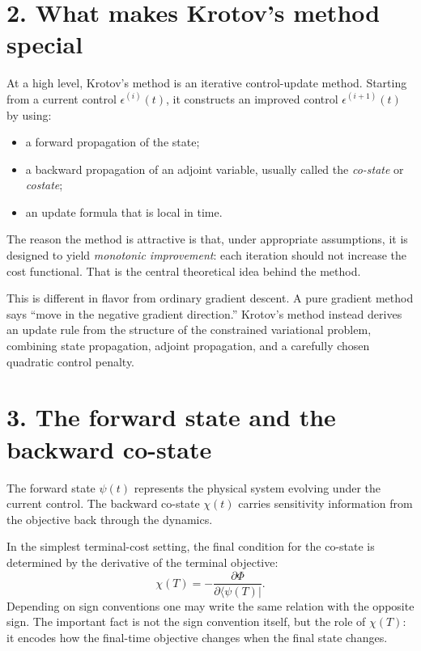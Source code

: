 \documentclass[11pt]{article}
\begin{document}
\section*{2. What makes Krotov's method special}
At a high level, Krotov's method is an iterative control-update method. Starting from a current control $\epsilon^{(i)}(t)$, it constructs an improved control $\epsilon^{(i+1)}(t)$ by using:
\begin{itemize}
\item a forward propagation of the state;
\item a backward propagation of an adjoint variable, usually called the \emph{co-state} or \emph{costate};
\item an update formula that is local in time.
\end{itemize}

The reason the method is attractive is that, under appropriate assumptions, it is designed to yield \emph{monotonic improvement}: each iteration should not increase the cost functional. That is the central theoretical idea behind the method.

This is different in flavor from ordinary gradient descent. A pure gradient method says ``move in the negative gradient direction.'' Krotov's method instead derives an update rule from the structure of the constrained variational problem, combining state propagation, adjoint propagation, and a carefully chosen quadratic control penalty.

\section*{3. The forward state and the backward co-state}
The forward state $\psi(t)$ represents the physical system evolving under the current control. The backward co-state $\chi(t)$ carries sensitivity information from the objective back through the dynamics.

In the simplest terminal-cost setting, the final condition for the co-state is determined by the derivative of the terminal objective:
\begin{equation}
\chi(T) = - \frac{\partial \Phi}{\partial \langle \psi(T) |}.
\label{eq:costate_terminal}
\end{equation}
Depending on sign conventions one may write the same relation with the opposite sign. The important fact is not the sign convention itself, but the role of $\chi(T)$: it encodes how the final-time objective changes when the final state changes.
\end{document}
